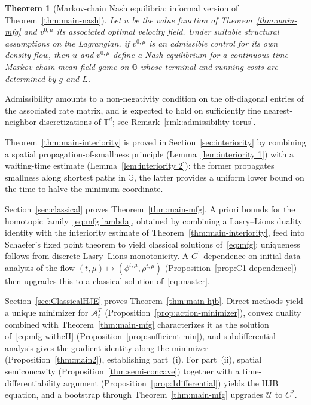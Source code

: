 \documentclass[10pt]{article}
\newtheorem{theorem}{Theorem}[section]
\numberwithin{equation}{section}
\newcommand{\cA}{ \mathcal{A}}
\newcommand{\cU}{ \mathcal{U}}
\newcommand{\bG}{\mathbb G}
\begin{document}
\begin{theorem}[Markov-chain Nash equilibria; informal version of Theorem~\ref{thm:main-nash}]
Let $u$ be the value function of Theorem~\ref{thm:main-mfg} and $v^{0,\mu}$ its associated optimal velocity field. Under suitable structural assumptions on the Lagrangian, if $v^{0,\mu}$ is an admissible control for its own density flow, then $u$ and $v^{0,\mu}$ define a Nash equilibrium for a continuous-time Markov-chain mean field game on $\bG$ whose terminal and running costs are determined by $g$ and $L$.
\end{theorem}

Admissibility amounts to a non-negativity condition on the off-diagonal entries of the associated rate matrix, and is expected to hold on sufficiently fine nearest-neighbor discretizations of $\mathbb T^d$; see Remark~\ref{rmk:admissibility-torus}.


Theorem~\ref{thm:main-interiority} is proved in Section~\ref{sec:interiority} by combining a spatial propagation-of-smallness principle (Lemma~\ref{lem:interiority 1}) with a waiting-time estimate (Lemma~\ref{lem:interiority 2}): the former propagates smallness along shortest paths in $\bG$, the latter provides a uniform lower bound on the time to halve the minimum coordinate.

Section~\ref{sec:classical} proves Theorem~\ref{thm:main-mfg}. A priori bounds for the homotopic family~\eqref{eq:mfg lambda}, obtained by combining a Lasry--Lions duality identity with the interiority estimate of Theorem~\ref{thm:main-interiority}, feed into Schaefer's fixed point theorem to yield classical solutions of~\eqref{eq:mfg}; uniqueness follows from discrete Lasry--Lions monotonicity. A $C^1$-dependence-on-initial-data analysis of the flow $(t,\mu)\mapsto(\phi^{t,\mu},\rho^{t,\mu})$ (Proposition~\ref{prop:C1-dependence}) then upgrades this to a classical solution of~\eqref{eq:master}.

Section~\ref{sec:ClassicalHJE} proves Theorem~\ref{thm:main-hjb}. Direct methods yield a unique minimizer for $\cA_t^T$ (Proposition~\ref{prop:action-minimizer}), convex duality combined with Theorem~\ref{thm:main-mfg} characterizes it as the solution of~\eqref{eq:mfg-withcH} (Proposition~\ref{prop:sufficient-min}), and subdifferential analysis gives the gradient identity along the minimizer (Proposition~\ref{thm:main2}), establishing part~(i). For part~(ii), spatial semiconcavity (Proposition~\ref{thm:semi-concave}) together with a time-differentiability argument (Proposition~\ref{prop:1differential}) yields the HJB equation, and a bootstrap through Theorem~\ref{thm:main-mfg} upgrades $\cU$ to $C^2$.
\end{document}
